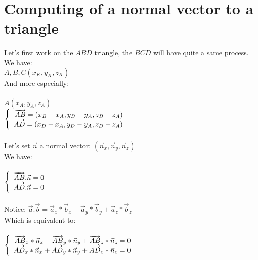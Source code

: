 \documentclass{article}
\begin{document}
	\section{Computing of a normal vector to a triangle}

		Let's first work on the $ABD$ triangle, the $BCD$ will have quite a same process.\\
		We have:\\
		$A, B, C(x_K, y_K, z_K)$\\
		And more especially:\\\\
		
		$A(x_A, y_A, z_A)$\\
		$\left\{\begin{array}{r c l}
			\overrightarrow{AB}=(x_B - x_A, y_B - y_A, z_B - z_A)\\
			\overrightarrow{AD}=(x_D - x_A, y_D - y_A, z_D - z_A)
		\end{array}\right.$\\\\

		Let's set $\vec{n}$ a normal vector: $(\vec{n}_x, \vec{n}_y, \vec{n}_z)$\\
		We have:\\\\
		
		$\left\{\begin{array}{r c l}
			\overrightarrow{AB}.\vec{n} = 0\\
			\overrightarrow{AD}.\vec{n} = 0
		\end{array}\right.$\\\\
		
		Notice: $\vec{a}.\vec{b}=\vec{a}_x * \vec{b}_x + \vec{a}_y * \vec{b}_y + \vec{a}_z * \vec{b}_z$\\
		
		Which is equivalent to:\\\\
		
		$\left\{\begin{array}{r c l}
			\overrightarrow{AB}_x * \vec{n}_x + \overrightarrow{AB}_y * \vec{n}_y + \overrightarrow{AB}_z * \vec{n}_z = 0\\
			\overrightarrow{AD}_x * \vec{n}_x + \overrightarrow{AD}_y * \vec{n}_y + \overrightarrow{AD}_z * \vec{n}_z = 0
		\end{array}\right.$\\\\
		
\end{document}
